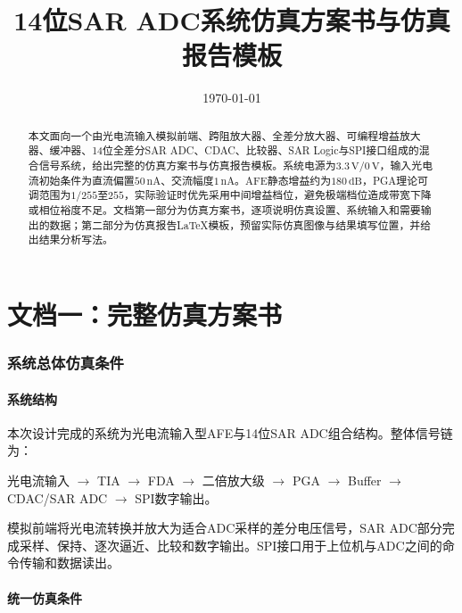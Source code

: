 \documentclass[12pt,a4paper]{ctexart}
\title{14位SAR ADC系统仿真方案书与仿真报告模板}
\author{}
\date{\today}
\begin{document}
\maketitle

\begin{abstract}
本文面向一个由光电流输入模拟前端、跨阻放大器、全差分放大器、可编程增益放大器、缓冲器、14位全差分SAR ADC、CDAC、比较器、SAR Logic与SPI接口组成的混合信号系统，给出完整的仿真方案书与仿真报告模板。系统电源为$3.3\,\mathrm{V}/0\,\mathrm{V}$，输入光电流初始条件为直流偏置$50\,\mathrm{nA}$、交流幅度$1\,\mathrm{nA}$。AFE静态增益约为$180\,\mathrm{dB}$，PGA理论可调范围为$1/255$至$255$，实际验证时优先采用中间增益档位，避免极端档位造成带宽下降或相位裕度不足。文档第一部分为仿真方案书，逐项说明仿真设置、系统输入和需要输出的数据；第二部分为仿真报告LaTeX模板，预留实际仿真图像与结果填写位置，并给出结果分析写法。
\end{abstract}

\tableofcontents
\newpage

\part{文档一：完整仿真方案书}

\section{系统总体仿真条件}

\subsection{系统结构}

本次设计完成的系统为光电流输入型AFE与14位SAR ADC组合结构。整体信号链为：
\begin{center}
光电流输入 $\rightarrow$ TIA $\rightarrow$ FDA $\rightarrow$ 二倍放大级 $\rightarrow$ PGA $\rightarrow$ Buffer $\rightarrow$ CDAC/SAR ADC $\rightarrow$ SPI数字输出。
\end{center}

模拟前端将光电流转换并放大为适合ADC采样的差分电压信号，SAR ADC部分完成采样、保持、逐次逼近、比较和数字输出。SPI接口用于上位机与ADC之间的命令传输和数据读出。

\subsection{统一仿真条件}
\end{document}
